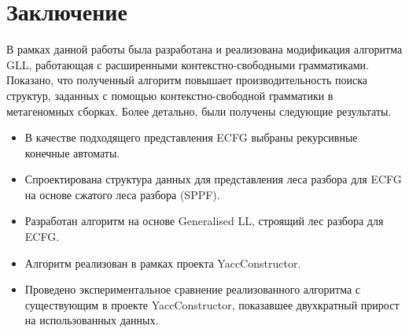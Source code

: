\documentclass[12pt]{matmex-diploma-custom}
\begin{document}
	\section*{Заключение}
	В рамках данной работы была разработана и реализована модификация алгоритма GLL,
	работающая с расширенными контекстно-свободными грамматиками. Показано, что полученный
	алгоритм повышает производительность поиска структур, заданных с помощью контекстно-свободной
	грамматики в метагеномных сборках. Более детально, были получены следующие результаты.
	\begin{itemize}
		\item В качестве подходящего представления ECFG выбраны рекурсивные конечные автоматы.
		\item Спроектирована структура данных для представления леса разбора для ECFG 
		на основе сжатого леса разбора (SPPF).
		\item Разработан алгоритм на основе Generalised LL, строящий лес разбора для ECFG.
		\item Алгоритм реализован в рамках проекта YaccConstructor.
		\item Проведено экспериментальное сравнение реализованного алгоритма с существующим в проекте YaccConstructor,
         показавшее двухкратный прирост на использованных данных.
	\end{itemize}
	
	\setmonofont[Mapping=tex-text]{CMU Typewriter Text}
	
	
\end{document}
